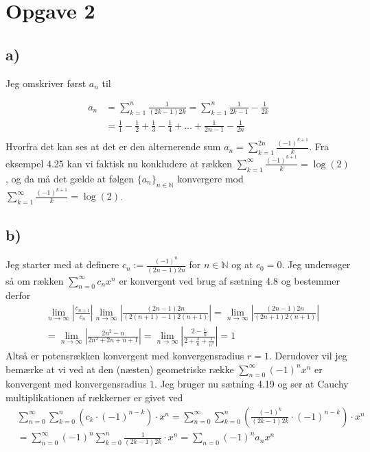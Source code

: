 \documentclass{article}
\newcommand{\m}[1]{\mathbb{#1}}
\newcommand{\mN}{\m{N}}
\newcommand{\abs}[1]{\left| #1\right|}
\begin{document}
\section*{Opgave 2}
\subsection*{a)}
Jeg omskriver først $a_n$ til 

\begin{align*}
    a_n &= \sum_{k=1}^{n} \frac{1}{(2k-1)2k} 
    = \sum_{k=1}^{n} \frac{1}{2k-1} - \frac{1}{2k}  \\
    &= \frac{1}{1} - \frac{1}{2} + \frac{1}{3} - \frac{1}{4} + \dots + \frac{1}{2n-1} - \frac{1}{2n} \\
\end{align*}
Hvorfra det kan ses at det er den alternerende sum $a_n = \sum_{k=1}^{2n} \frac{(-1)^{k+1}}{k}$.
Fra eksempel 4.25 \cite[s. 151]{an1} kan vi faktisk nu konkludere at rækken
$\sum_{k=1}^{\infty} \frac{(-1)^{k+1}}{k} = \log(2)$, og da må det gælde at følgen $\{a_n\}_{n \in \mN}$ konvergere mod
$\sum_{k=1}^{\infty} \frac{(-1)^{k+1}}{k} = \log(2)$.

\subsection*{b)}
Jeg starter med at definere $c_n := \frac{(-1)^{n}}{(2n-1)2n}$ for $n \in \mN$ 
og at $c_0 = 0$.
Jeg undersøger så om rækken $\sum_{n=0}^{\infty} c_n x^n$ 
er konvergent ved brug af sætning 4.8 \cite{an1} og bestemmer derfor 
\begin{align*}
    & \lim_{n \to \infty} \abs{\frac{c_{n+1}}{c_n}} \lim_{n \to \infty} |\frac{(2n-1)2n}{(2(n+1) -1)2(n+1)}| 
    = \lim_{n \to \infty} |\frac{(2n-1)2n}{(2n+1)2(n+1)}|  \\
    &= \lim_{n \to \infty} |\frac{2n^2-n}{2n^2 + 2n + n + 1}| 
    = \lim_{n \to \infty} |\frac{2-\frac{1}{n}}{2 + \frac{3}{n} + \frac{1}{n^2}}|
    = 1
\end{align*}
Altså er potensrækken konvergent med konvergensradius $r=1$. Derudover vil jeg bemærke at
vi ved at den (næsten) geometriske række $\sum_{n=0}^{\infty} (-1)^n x^n$ er konvergent med konvergensradius $1$.
Jeg bruger nu sætning 4.19 \cite{an1} og ser at Cauchy multiplikationen af rækkerner er givet ved
\begin{align*}
    &\sum_{n=0}^{\infty} \sum_{k=0}^{n} (c_k \cdot (-1)^{n-k}) \cdot x^n 
    =\sum_{n=0}^{\infty} \sum_{k=0}^{n} (\frac{(-1)^{k}}{(2k-1)2k} \cdot (-1)^{n-k}) \cdot x^n  \\
    &= \sum_{n=0}^{\infty} (-1)^n \sum_{k=0}^{n} \frac{1}{(2k-1)2k} \cdot x^n
    = \sum_{n=0} (-1)^n a_n x^n
\end{align*}
\end{document}
